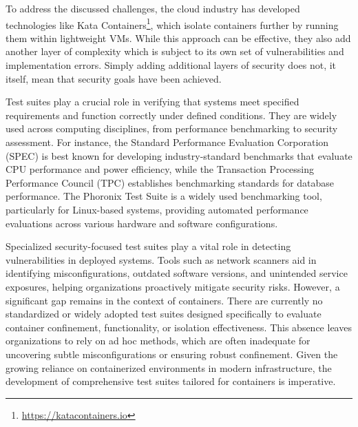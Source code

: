 To address the discussed challenges, the cloud industry has developed technologies like Kata Containers\footnote{\url{https://katacontainers.io}}, which isolate containers further by running them within lightweight VMs. While this approach can be effective, they also add another layer of complexity which is subject to its own set of vulnerabilities and implementation errors. Simply adding additional layers of security does not, it itself, mean that security goals have been achieved.

Test suites play a crucial role in verifying that systems meet specified requirements and function correctly under defined conditions. They are widely used across computing disciplines, from performance benchmarking to security assessment. For instance, the Standard Performance Evaluation Corporation (SPEC) \cite{henning2000spec} is best known for developing industry-standard benchmarks that evaluate CPU performance and power efficiency, while the Transaction Processing Performance Council (TPC) \cite{10.1007/978-3-642-18206-8_1} establishes benchmarking standards for database performance. The Phoronix Test Suite \cite{zboril2025performance} is a widely used benchmarking tool, particularly for Linux-based systems, providing automated performance evaluations across various hardware and software configurations. 

Specialized security-focused test suites play a vital role in detecting vulnerabilities in deployed systems. Tools such as network scanners aid in identifying misconfigurations, outdated software versions, and unintended service exposures, helping organizations proactively mitigate security risks. However, a significant gap remains in the context of containers. There are currently no standardized or widely adopted test suites designed specifically to evaluate container confinement, functionality, or isolation effectiveness. This absence leaves organizations to rely on ad hoc methods, which are often inadequate for uncovering subtle misconfigurations or ensuring robust confinement. Given the growing reliance on containerized environments in modern infrastructure, the development of comprehensive test suites tailored for containers is imperative.

